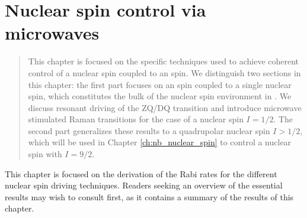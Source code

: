 
\setchapterpreamble[u]{\margintoc}
\chapter{Nuclear spin control via microwaves}

\begin{quote}
\itshape

This chapter is focused on the specific techniques used to achieve coherent control of a nuclear spin coupled to an \Er spin. We distinguish two sections in this chapter: the first part focuses on an \Er spin coupled to a single \W nuclear spin, which constitutes the bulk of the nuclear spin environment in \Ca. We discuss resonant driving of the ZQ/DQ transition and introduce microwave stimulated Raman transitions for the case of a nuclear spin $I=1/2$. The second part generalizes these results to a quadrupolar nuclear spin $I>1/2$, which will be used in Chapter \ref{ch:nb_nuclear_spin} to control a \Nb nuclear spin with $I=9/2$.

\end{quote}

This chapter is focused on the derivation of the Rabi rates for the different nuclear spin driving techniques. Readers seeking an overview of the essential results may wish to consult  first, as it contains a summary of the results of this chapter.





